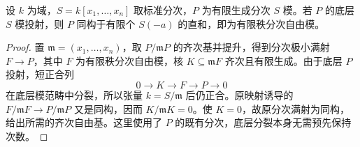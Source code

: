 \begin{proposition}\label{b3:prop:graded-projective-free}
	设 \(k\) 为域，\(S=k[x_1,\ldots,x_n]\) 取标准分次，\(P\) 为有限生成分次 \(S\) 模。若 \(P\) 的底层 \(S\) 模投射，则 \(P\) 同构于有限个 \(S(-a)\) 的直和，即为有限秩分次自由模。
\end{proposition}
\begin{proof}
	置 \(\mathfrak m=(x_1,\ldots,x_n)\)，取 \(P/\mathfrak mP\) 的齐次基并提升，得到分次极小满射 \(F\to P\)，其中 \(F\) 为有限秩分次自由模，核 \(K\subseteq\mathfrak mF\) 齐次且有限生成。由于底层 \(P\) 投射，短正合列
	\[
		0\longrightarrow K\longrightarrow F\longrightarrow P\longrightarrow0
	\]
	在底层模范畴中分裂，所以张量 \(k=S/\mathfrak m\) 后仍正合。原映射诱导的 \(F/\mathfrak mF\to P/\mathfrak mP\) 又是同构，因而 \(K/\mathfrak mK=0\)。使 \(K=0\)，故原分次满射为同构，给出所需的齐次自由基。这里使用了 \(P\) 的既有分次，底层分裂本身无需预先保持次数。
\end{proof}
